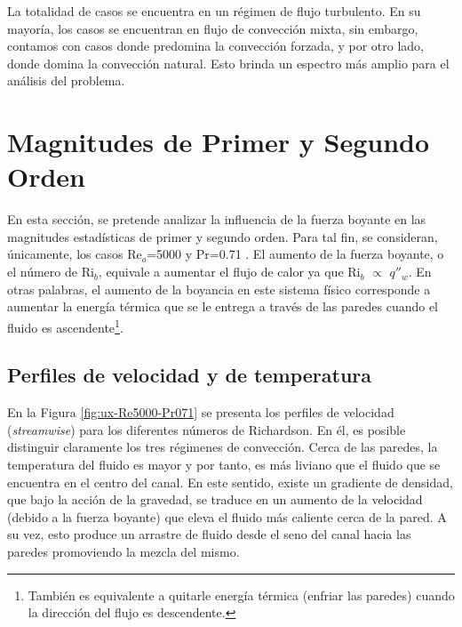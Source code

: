 La totalidad de casos se encuentra en un régimen de flujo turbulento. En su mayoría, los casos se encuentran en flujo de convección mixta, sin embargo, contamos con casos donde predomina la convección forzada, y por otro lado, donde domina la convección natural. Esto brinda un espectro más amplio para el análisis del problema.



\section{Magnitudes de Primer y Segundo Orden}

En esta sección, se pretende analizar la influencia de la fuerza boyante en las magnitudes estadísticas de primer y segundo orden. Para tal fin, se consideran, únicamente, los casos Re$_o$=5000 y Pr=0.71 . El aumento de la fuerza boyante, o el número de Ri$_b$, equivale a aumentar el flujo de calor ya que Ri$_b$ $\propto$ $q''_w$. En otras palabras, el aumento de la boyancia en este sistema físico corresponde a aumentar la energía térmica que se le entrega a través de las paredes cuando el fluido es ascendente\footnote{También es equivalente a quitarle energía térmica (enfriar las paredes) cuando la dirección del flujo es descendente.}.


\subsection{Perfiles de velocidad y de temperatura} \label{sec:velo_temp}

En la Figura \ref{fig:ux-Re5000-Pr071} se presenta los perfiles de velocidad (\textit{streamwise}) para los diferentes números de Richardson. En él, es posible distinguir claramente los tres régimenes de convección. Cerca de las paredes, la temperatura del fluido es mayor y por tanto, es más liviano que el fluido que se encuentra en el centro del canal. En este sentido, existe un gradiente de densidad, que bajo la acción de la gravedad, se traduce en un aumento de la velocidad (debido a la fuerza boyante) que eleva el fluido más caliente cerca de la pared. A su vez, esto produce un arrastre de fluido desde el seno del canal hacia las paredes promoviendo la mezcla del mismo.

